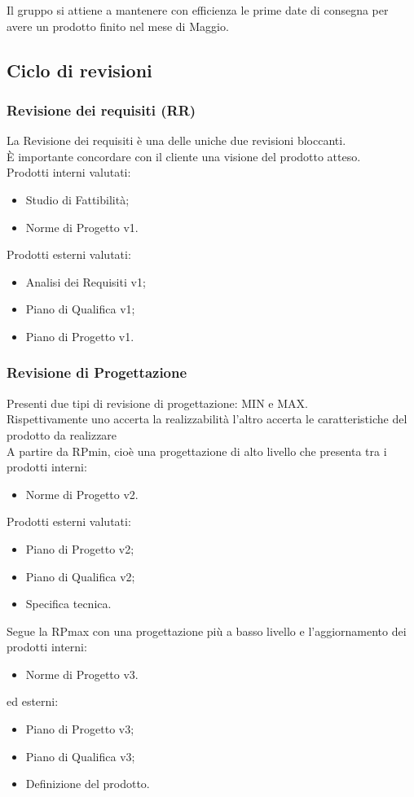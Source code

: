 \documentclass[12pt,a4paper,titlepage]{article}
\begin{document}
	Il gruppo si attiene a mantenere con efficienza le prime date di consegna per avere un prodotto finito nel mese di Maggio.
	
	\normalsize
	\subsection{Ciclo di revisioni}
	\subsubsection{Revisione dei requisiti (RR)}
	La Revisione dei requisiti è una delle uniche due revisioni bloccanti.\\
	È importante concordare con il cliente una visione del prodotto atteso.\\
	Prodotti interni valutati:
	\begin{itemize}
		\item Studio di Fattibilità;
		\item Norme di Progetto v1.
	\end{itemize}
	Prodotti esterni valutati:
	\begin{itemize}
		\item Analisi dei Requisiti v1;
		\item Piano di Qualifica v1;
		\item Piano di Progetto v1.
	\end{itemize}
	
	\subsubsection{Revisione di Progettazione}
	Presenti due tipi di revisione di progettazione: MIN e MAX. \\
	Rispettivamente uno accerta la realizzabilità l'altro accerta le caratteristiche del prodotto da realizzare\\
	A partire da RPmin, cioè una progettazione di alto livello che presenta tra i prodotti interni:
	\begin{itemize}
		\item Norme di Progetto v2.
	\end{itemize}
	Prodotti esterni valutati: 
	\begin{itemize}
		\item Piano di Progetto v2;
		\item Piano di Qualifica v2;
		\item Specifica tecnica.
	\end{itemize}
	Segue la RPmax con una progettazione più a basso livello e l'aggiornamento dei prodotti interni:
	\begin{itemize}
		\item Norme di Progetto v3.
	\end{itemize}
	ed esterni:
	\begin{itemize}
		\item Piano di Progetto v3;
		\item Piano di Qualifica v3;
		\item Definizione del prodotto.
	\end{itemize}
	
\end{document}
